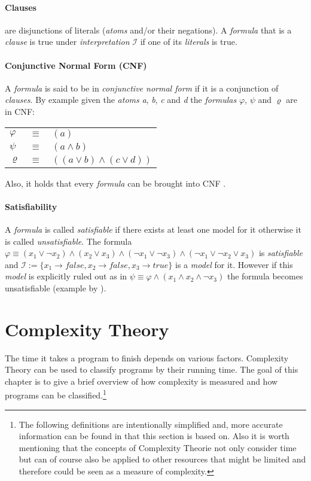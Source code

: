 \paragraph{Clauses}
are disjunctions of literals (\emph{atoms} and/or their negations). A \emph{formula} that is a \emph{clause} is true under \emph{interpretation} $\mathcal{I}$ if one of its \emph{literals} is true.

\paragraph{Conjunctive Normal Form (CNF)}
A \emph{formula} is said to be in \emph{conjunctive normal form} if it is a conjunction of \emph{clauses}. 
By example given the \emph{atoms} \emph{a}, \emph{b}, \emph{c} and \emph{d} the \emph{formulas} $\varphi$, $\psi$ and $\varrho$ are in CNF:
\begin{center}
    \begin{tabular}{ l l l }
    $\varphi$ & $\equiv$ & $(a)$\\
    $\psi$ & $\equiv$ & $(a \land b)$\\
    $\varrho$ & $\equiv$ & $((a \lor b) \land (c \lor d))$\\
\end{tabular}
\end{center}
Also, it holds that every \emph{formula} can be brought into CNF \cite{LogicForComputerScientists}.

\paragraph{Satisfiability} \label{Satisfiability} A \emph{formula} is called \emph{satisfiable} if there exists at least one model for it otherwise it is called \emph{unsatisfiable}. The formula $\varphi \equiv (x_1 \lor \neg x_2) \land (x_2 \lor x_3) \land (\neg x_1 \lor \neg x_3) \land (\neg x_1 \lor \neg x_2 \lor x_3)$ is \emph{satisfiable} and $\mathcal{I}:= \{x_1 \rightarrow false, x_2 \rightarrow false, x_3 \rightarrow true\}$ is a \emph{model} for it. However if this \emph{model} is explicitly ruled out as in $\psi \equiv \varphi \land (x_1 \land x_2 \land \neg x_3)$ the formula becomes unsatisfiable (example by \cite{10.5555/1121689}).

\newpage
\section{Complexity Theory}
The time it takes a program to finish depends on various factors. Complexity Theory can be used to classify programs by their running time. The goal of this chapter is to give a brief overview of how complexity is measured and how programs can be classified.\footnote{The following definitions are intentionally simplified and, more accurate information can be found in \cite{IntroductionToTheTheoryOfComputation} that this section is based on. Also it is worth mentioning that the concepts of Complexity Theorie not only consider time but can of course also be applied to other resources that might be limited and therefore could be seen as a measure of complexity.}

